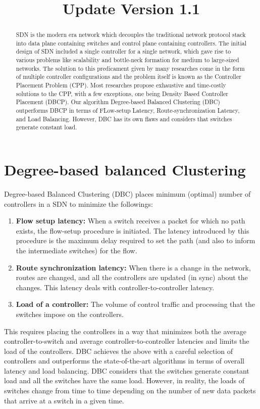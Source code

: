 \documentclass{article}
\begin{document}
	\title{Update Version 1.1}
	
	\maketitle
	\begin{abstract}
		SDN is the modern era network which decouples the traditional network protocol stack into data plane containing switches and control plane containing controllers. The initial design of SDN included a single controller for a single network, which gave rise to various problems like scalability and bottle-neck formation for medium to large-sized networks. The solution to this predicament given by many researches come in the form of multiple controller configurations and the problem itself is known as the Controller Placement Problem (CPP). Most researches propose exhaustive and time-costly solutions to the CPP, with a few exceptions, one being Density Based Controller Placement (DBCP). Our algorithm Degree-based Balanced Clustering (DBC) outperforms DBCP in terms of FLow-setup Latency, Route-synchronization Latency, and Load Balancing. However, DBC has its own flaws and considers that switches generate constant load.
	\end{abstract}
	\section{Degree-based balanced Clustering}
	Degree-based Balanced Clustering (DBC) places minimum (optimal) number of controllers in a SDN to minimize the followings:
	\begin{enumerate}
		\item \textbf{Flow setup latency:}	When a switch receives a packet for which no path exists, the flow-setup procedure is initiated.  The latency introduced by this procedure is the maximum delay required to set the path (and also to inform the intermediate switches) for the flow.
		\item \textbf{Route synchronization latency:}	When there is a change in the network, routes are changed, and all the controllers are updated (in sync) about the changes. This latency deals with controller-to-controller latency.
		\item \textbf{Load of a controller:}	 The volume of control traffic and processing that the switches impose on the controllers.
	\end{enumerate}
	This requires placing the controllers in a way that minimizes both the average controller-to-switch and average controller-to-controller latencies and limits the load of the controllers. DBC achieves the above with a careful selection of controllers and outperforms the state-of-the-art algorithms in terms of overall latency and load balancing. DBC considers that the switches generate constant load and all the switches have the same load. However, in reality, the loads of switches change from time to time depending on the number of new data packets that arrive at a switch in a given time.
	
\end{document}
